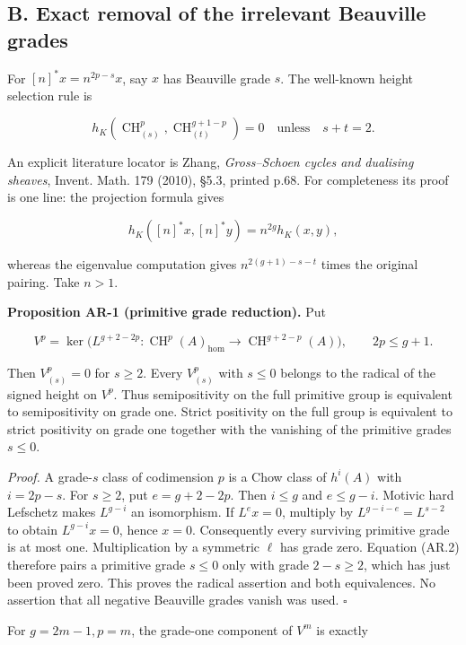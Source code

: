 \documentclass[11pt,a4paper]{article}
\begin{document}
\subsection{B. Exact removal of the irrelevant Beauville
grades}\label{b.-exact-removal-of-the-irrelevant-beauville-grades}

For \([n]^*x=n^{2p-s}x\), say \(x\) has Beauville grade \(s\). The
well-known height selection rule is

\[
h_K(\operatorname{CH}^p_{(s)},\operatorname{CH}^{g+1-p}_{(t)})=0
\quad\text{unless}\quad s+t=2.
\tag{AR.2}
\]

An explicit literature locator is Zhang, \emph{Gross--Schoen cycles and
dualising sheaves}, Invent. Math. 179 (2010), §5.3, printed p.68. For
completeness its proof is one line: the projection formula gives

\[
h_K([n]^*x,[n]^*y)=n^{2g}h_K(x,y),
\]

whereas the eigenvalue computation gives \(n^{2(g+1)-s-t}\) times the
original pairing. Take \(n>1\).

\textbf{Proposition AR-1 (primitive grade reduction).} Put

\[
V^p=\ker\bigl(L^{g+2-2p}:\operatorname{CH}^p(A)_{\mathrm{hom}}
\longrightarrow\operatorname{CH}^{g+2-p}(A)\bigr),\qquad 2p\le g+1.
\]

Then \(V^p_{(s)}=0\) for \(s\ge2\). Every \(V^p_{(s)}\) with \(s\le0\)
belongs to the radical of the signed height on \(V^p\). Thus
semipositivity on the full primitive group is equivalent to
semipositivity on grade one. Strict positivity on the full group is
equivalent to strict positivity on grade one together with the vanishing
of the primitive grades \(s\le0\).

\emph{Proof.} A grade-\(s\) class of codimension \(p\) is a Chow class
of \(h^i(A)\) with \(i=2p-s\). For \(s\ge2\), put \(e=g+2-2p\). Then
\(i\le g\) and \(e\le g-i\). Motivic hard Lefschetz makes \(L^{g-i}\) an
isomorphism. If \(L^e x=0\), multiply by \(L^{g-i-e}=L^{s-2}\) to obtain
\(L^{g-i}x=0\), hence \(x=0\). Consequently every surviving primitive
grade is at most one. Multiplication by a symmetric \(\ell\) has grade
zero. Equation (AR.2) therefore pairs a primitive grade \(s\le0\) only
with grade \(2-s\ge2\), which has just been proved zero. This proves the
radical assertion and both equivalences. No assertion that all negative
Beauville grades vanish was used. \(\square\)

For \(g=2m-1,p=m\), the grade-one component of \(V^m\) is exactly
\end{document}
